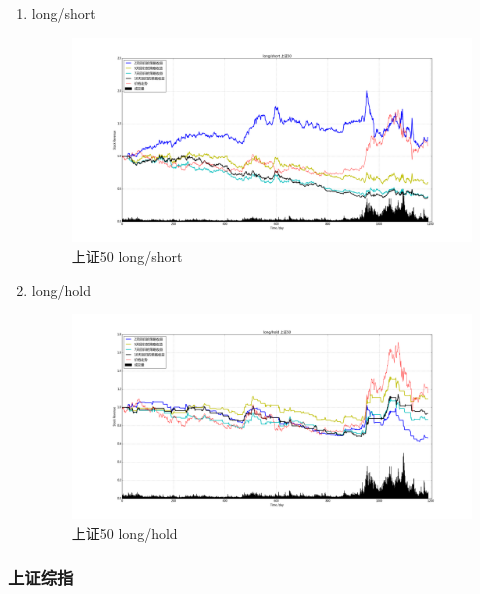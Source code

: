 \documentclass[12pt,a4paper]{article}
\begin{document}
\begin{enumerate}
\item long/short 
\begin{figure}[H]
	\centering
	\includegraphics[width=1.0\textwidth]{img_r_7/sz50.png}
	\caption{上证50 long/short}
\end{figure}

\item long/hold 
\begin{figure}[H]
	\centering
	\includegraphics[width=1.0\textwidth]{img_r_7/sz50_1.png}
	\caption{上证50 long/hold}
\end{figure}
\end{enumerate}

\subsubsection{上证综指}
\end{document}
